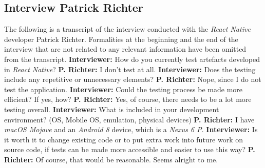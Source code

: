 \begin{appendices}
\newpage

\section{Interview Patrick Richter}
\label{appendix:interview_patrick_richter}

The following is a transcript of the interview conducted with the \textit{React Native} developer Patrick Richter. Formalities at the beginning and the end of the interview that are not related to any relevant information have been omitted from the transcript.
\newline
\newline
\textbf{Interviewer:} How do you currently test artefacts developed in \textit{React Native}?
\newline
\newline
\textbf{P. Richter:} I don't test at all.
\newline
\newline
\textbf{Interviewer:} Does the testing include any repetitive or unnecessary elements?
\newline
\newline
\textbf{P. Richter:} Nope, since I do not test the application.
\newline
\newline
\textbf{Interviewer:} Could the testing process be made more efficient? If yes, how?
\newline
\newline
\textbf{P. Richter:} Yes, of course, there needs to be a lot more testing overall.
\newline
\newline
\textbf{Interviewer:} What is included in your development environment? (OS, Mobile OS, emulation, physical devices)
\newline
\newline
\textbf{P. Richter:} I have \textit{macOS Mojave} and an \textit{Android 8} device, which is a \textit{Nexus 6 P}.
\newline
\newline
\textbf{Interviewer:} Is it worth it to change existing code or to put extra work into future work on source code, if tests can be made more accessible and easier to use this way?
\newline
\newline
\textbf{P. Richter:} Of course, that would be reasonable. Seems alright to me.

\end{appendices}